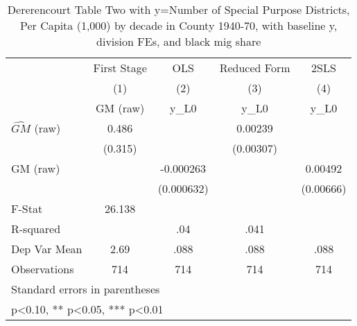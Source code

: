 \begin{table}[htbp]\centering
\def\sym#1{\ifmmode^{#1}\else\(^{#1}\)\fi}
\caption{Dererencourt Table Two with y=Number of Special Purpose Districts, Per Capita (1,000) by decade in County 1940-70, with baseline y, division FEs, and black mig share}
\begin{tabular}{l*{4}{c}}
\toprule
                    & First Stage   &         OLS   &Reduced Form   &        2SLS   \\
                    &\multicolumn{1}{c}{(1)}&\multicolumn{1}{c}{(2)}&\multicolumn{1}{c}{(3)}&\multicolumn{1}{c}{(4)}\\
                    &\multicolumn{1}{c}{GM  (raw)}&\multicolumn{1}{c}{y\_L0}&\multicolumn{1}{c}{y\_L0}&\multicolumn{1}{c}{y\_L0}\\
\midrule
$\hat{GM}$ (raw)    &       0.486   &               &     0.00239   &               \\
                    &     (0.315)   &               &   (0.00307)   &               \\
\addlinespace
GM  (raw)           &               &   -0.000263   &               &     0.00492   \\
                    &               &  (0.000632)   &               &   (0.00666)   \\
\midrule
F-Stat              &      26.138   &               &               &               \\
R-squared           &               &         .04   &        .041   &               \\
Dep Var Mean        &        2.69   &        .088   &        .088   &        .088   \\
Observations        &         714   &         714   &         714   &         714   \\
\bottomrule
\multicolumn{5}{l}{\footnotesize Standard errors in parentheses}\\
\multicolumn{5}{l}{\footnotesize * p<0.10, ** p<0.05, *** p<0.01}\\
\end{tabular}
\end{table}
